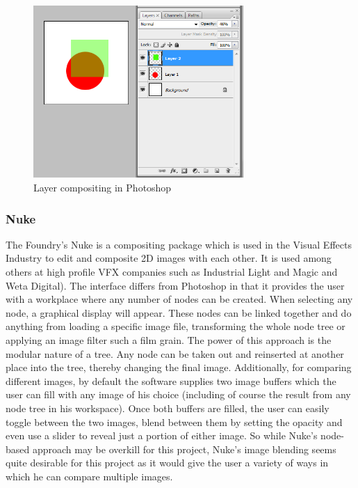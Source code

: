 \documentclass[a4paper,11pt,titlepage]{article}
\begin{document}
\begin{figure}[ht!]
\centering
\includegraphics[width=80mm]{graphics/photoshop_01.png}
\caption{Layer compositing in Photoshop}
\label{fig:UIdesign1}
\end{figure}

\subsubsection{Nuke}
The Foundry's Nuke is a compositing package which is used in the Visual Effects Industry to edit and composite 2D images with each other. It is used among others at high profile VFX companies such as Industrial Light and Magic and Weta Digital). The interface differs from Photoshop in that it provides the user with a workplace where any number of nodes can be created. When selecting any node, a graphical display will appear. These nodes can be linked together and do anything from loading a specific image file, transforming the whole node tree or applying an image filter such a film grain. The power of this approach is the modular nature of a tree. Any node can be taken out and reinserted at another place into the tree, thereby changing the final image. Additionally, for comparing different images, by default the software supplies two image buffers which the user can fill with any image of his choice (including of course the result from any node tree in his workspace). Once both buffers are filled, the user can easily toggle between the two images, blend between them by setting the opacity and even use a slider to reveal just a portion of either image. So while Nuke's node-based approach may be overkill for this project, Nuke's image blending seems quite desirable for this project as it would give the user a variety of ways in which he can compare multiple images. 
\end{document}
